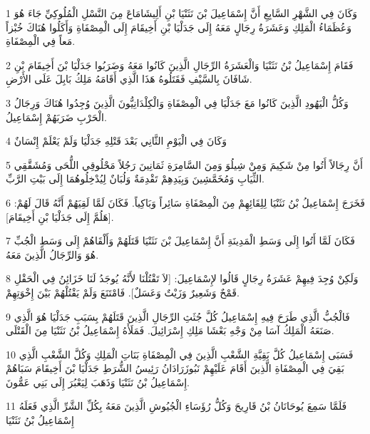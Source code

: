 \par 1 وَكَانَ فِي الشَّهْرِ السَّابِعِ أَنَّ إِسْمَاعِيلَ بْنَ نَثَنْيَا بْنِ أَلِيشَامَاعَ مِنَ النَّسْلِ الْمُلُوكِيِّ جَاءَ هُوَ وَعُظَمَاءُ الْمَلِكِ وَعَشَرَةُ رِجَالٍ مَعَهُ إِلَى جَدَلْيَا بْنِ أَخِيقَامَ إِلَى الْمِصْفَاةِ وَأَكَلُوا هُنَاكَ خُبْزاً مَعاً فِي الْمِصْفَاةِ.
\par 2 فَقَامَ إِسْمَاعِيلُ بْنُ نَثَنْيَا وَالْعَشَرَةُ الرِّجَالِ الَّذِينَ كَانُوا مَعَهُ وَضَرَبُوا جَدَلْيَا بْنَ أَخِيقَامَ بْنِ شَافَانَ بِالسَّيْفِ فَقَتَلُوهُ هَذَا الَّذِي أَقَامَهُ مَلِكُ بَابِلَ عَلَى الأَرْضِ.
\par 3 وَكُلُّ الْيَهُودِ الَّذِينَ كَانُوا مَعَ جَدَلْيَا فِي الْمِصْفَاةِ وَالْكِلْدَانِيُّونَ الَّذِينَ وُجِدُوا هُنَاكَ وَرِجَالُ الْحَرْبِ ضَرَبَهُمْ إِسْمَاعِيلُ.
\par 4 وَكَانَ فِي الْيَوْمِ الثَّانِي بَعْدَ قَتْلِهِ جَدَلْيَا وَلَمْ يَعْلَمْ إِنْسَانٌ
\par 5 أَنَّ رِجَالاً أَتُوا مِنْ شَكِيمَ وَمِنْ شِيلُوَ وَمِنَ السَّامِرَةِ ثَمَانِينَ رَجُلاً مَحْلُوقِي اللُّحَى وَمُشَقَّقِي الثِّيَابِ وَمُخَمَّشِينَ وَبِيَدِهِمْ تَقْدِمَةٌ وَلُبَانٌ لِيُدْخِلُوهُمَا إِلَى بَيْتِ الرَّبِّ.
\par 6 فَخَرَجَ إِسْمَاعِيلُ بْنُ نَثَنْيَا لِلِقَائِهِمْ مِنَ الْمِصْفَاةِ سَائِراً وَبَاكِياً. فَكَانَ لَمَّا لَقِيَهُمْ أَنَّهُ قَالَ لَهُمْ: [هَلُمَّ إِلَى جَدَلْيَا بْنِ أَخِيقَامَ].
\par 7 فَكَانَ لَمَّا أَتُوا إِلَى وَسَطِ الْمَدِينَةِ أَنَّ إِسْمَاعِيلَ بْنَ نَثَنْيَا قَتَلَهُمْ وَأَلْقَاهُمْ إِلَى وَسَطِ الْجُبِّ هُوَ وَالرِّجَالُ الَّذِينَ مَعَهُ.
\par 8 وَلَكِنْ وُجِدَ فِيهِمْ عَشَرَةُ رِجَالٍ قَالُوا لإِسْمَاعِيلَ: [لاَ تَقْتُلْنَا لأَنَّهُ يُوجَدُ لَنَا خَزَائِنُ فِي الْحَقْلِ قَمْحٌ وَشَعِيرٌ وَزَيْتٌ وَعَسَلٌ]. فَامْتَنَعَ وَلَمْ يَقْتُلْهُمْ بَيْنَ إِخْوَتِهِمْ.
\par 9 فَالْجُبُّ الَّذِي طَرَحَ فِيهِ إِسْمَاعِيلُ كُلَّ جُثَثِ الرِّجَالِ الَّذِينَ قَتَلَهُمْ بِسَبَبِ جَدَلْيَا هُوَ الَّذِي صَنَعَهُ الْمَلِكُ آسَا مِنْ وَجْهِ بَعْشَا مَلِكِ إِسْرَائِيلَ. فَمَلَأَهُ إِسْمَاعِيلُ بْنُ نَثَنْيَا مِنَ الْقَتْلَى.
\par 10 فَسَبَى إِسْمَاعِيلُ كُلَّ بَقِيَّةِ الشَّعْبِ الَّذِينَ فِي الْمِصْفَاةِ بَنَاتِ الْمَلِكِ وَكُلَّ الشَّعْبِ الَّذِي بَقِيَ فِي الْمِصْفَاةِ الَّذِينَ أَقَامَ عَلَيْهِمْ نَبُوزَرَادَانُ رَئِيسُ الشُّرَطِ جَدَلْيَا بْنَ أَخِيقَامَ سَبَاهُمْ إِسْمَاعِيلُ بْنُ نَثَنْيَا وَذَهَبَ لِيَعْبُرَ إِلَى بَنِي عَمُّونَ.
\par 11 فَلَمَّا سَمِعَ يُوحَانَانُ بْنُ قَارِيحَ وَكُلُّ رُؤَسَاءِ الْجُيُوشِ الَّذِينَ مَعَهُ بِكُلِّ الشَّرِّ الَّذِي فَعَلَهُ إِسْمَاعِيلُ بْنُ نَثَنْيَا
